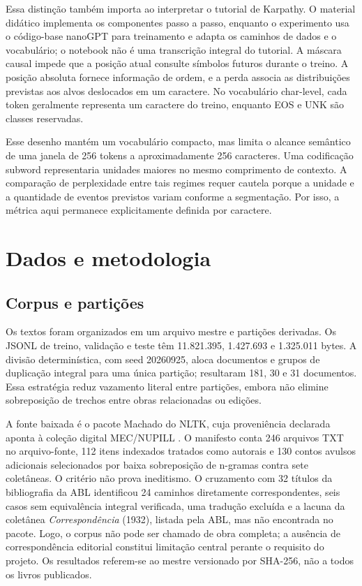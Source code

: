 \documentclass[conference]{IEEEtran}
\begin{document}
Essa distinção também importa ao interpretar o tutorial de Karpathy. O material didático implementa os componentes passo a passo, enquanto o experimento usa o código-base nanoGPT para treinamento e adapta os caminhos de dados e o vocabulário; o notebook não é uma transcrição integral do tutorial. A máscara causal impede que a posição atual consulte símbolos futuros durante o treino. A posição absoluta fornece informação de ordem, e a perda associa as distribuições previstas aos alvos deslocados em um caractere. No vocabulário char-level, cada token geralmente representa um caractere do treino, enquanto EOS e UNK são classes reservadas.

Esse desenho mantém um vocabulário compacto, mas limita o alcance semântico de uma janela de 256 tokens a aproximadamente 256 caracteres. Uma codificação subword representaria unidades maiores no mesmo comprimento de contexto. A comparação de perplexidade entre tais regimes requer cautela porque a unidade e a quantidade de eventos previstos variam conforme a segmentação. Por isso, a métrica aqui permanece explicitamente definida por caractere.

\section{Dados e metodologia}

\subsection{Corpus e partições}

Os textos foram organizados em um arquivo mestre e partições derivadas. Os JSONL de treino, validação e teste têm 11.821.395, 1.427.693 e 1.325.011 bytes. A divisão determinística, com seed 20260925, aloca documentos e grupos de duplicação integral para uma única partição; resultaram 181, 30 e 31 documentos. Essa estratégia reduz vazamento literal entre partições, embora não elimine sobreposição de trechos entre obras relacionadas ou edições.

A fonte baixada é o pacote Machado do NLTK, cuja proveniência declarada aponta à coleção digital MEC/NUPILL \cite{mecMachado,abl2020}. O manifesto conta 246 arquivos TXT no arquivo-fonte, 112 itens indexados tratados como autorais e 130 contos avulsos adicionais selecionados por baixa sobreposição de n-gramas contra sete coletâneas. O critério não prova ineditismo. O cruzamento com 32 títulos da bibliografia da ABL identificou 24 caminhos diretamente correspondentes, seis casos sem equivalência integral verificada, uma tradução excluída e a lacuna da coletânea \textit{Correspondência} (1932), listada pela ABL, mas não encontrada no pacote. Logo, o corpus não pode ser chamado de obra completa; a ausência de correspondência editorial constitui limitação central perante o requisito do projeto. Os resultados referem-se ao mestre versionado por SHA-256, não a todos os livros publicados.
\end{document}
